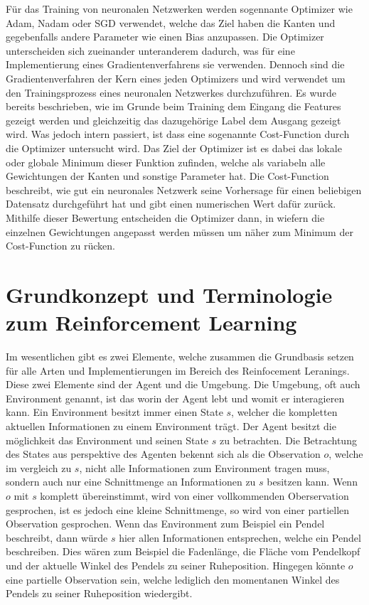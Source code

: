 \documentclass[]{iat}
\begin{document}
Für das Training von neuronalen Netzwerken werden sogennante Optimizer wie Adam, Nadam oder SGD verwendet, welche das Ziel haben die Kanten und gegebenfalls andere Parameter wie einen Bias anzupassen. Die Optimizer unterscheiden sich zueinander unteranderem dadurch, was für eine Implementierung eines Gradientenverfahrens sie verwenden. Dennoch sind die Gradientenverfahren der Kern eines jeden Optimizers und wird verwendet um den Trainingsprozess eines neuronalen Netzwerkes durchzuführen. Es wurde bereits beschrieben, wie im Grunde beim Training dem Eingang die Features gezeigt werden und gleichzeitig das dazugehörige Label dem Ausgang gezeigt wird. Was jedoch intern passiert, ist dass eine sogenannte Cost-Function durch die Optimizer untersucht wird. Das Ziel der Optimizer ist es dabei das lokale oder globale Minimum dieser Funktion zufinden, welche als variabeln alle Gewichtungen der Kanten und sonstige Parameter hat. Die Cost-Function beschreibt, wie gut ein neuronales Netzwerk seine Vorhersage für einen beliebigen Datensatz durchgeführt hat und gibt einen numerischen Wert dafür zurück. Mithilfe dieser Bewertung entscheiden die Optimizer dann, in wiefern die einzelnen Gewichtungen angepasst werden müssen um näher zum Minimum der Cost-Function zu rücken.

\section{Grundkonzept und Terminologie zum Reinforcement Learning} \label{sec:grundkonzept_rf}
Im wesentlichen gibt es zwei Elemente, welche zusammen die Grundbasis setzen für alle Arten und Implementierungen im Bereich des Reinfocement Leranings. Diese zwei Elemente sind der Agent und die Umgebung. Die Umgebung, oft auch Environment genannt, ist das worin der Agent lebt und womit er interagieren kann. Ein Environment besitzt immer einen State $s$, welcher die kompletten aktuellen Informationen zu einem Environment trägt. Der Agent besitzt die möglichkeit das Environment und seinen State $s$ zu betrachten. Die Betrachtung des States aus perspektive des Agenten bekennt sich als die Observation $o$, welche im vergleich zu $s$, nicht alle Informationen zum Environment tragen muss, sondern auch nur eine Schnittmenge an Informationen zu $s$ besitzen kann. Wenn $o$ mit $s$ komplett übereinstimmt, wird von einer vollkommenden Oberservation gesprochen, ist es jedoch eine kleine Schnittmenge, so wird von einer partiellen Observation gesprochen. Wenn das Environment zum Beispiel ein Pendel beschreibt, dann würde $s$ hier allen Informationen entsprechen, welche ein Pendel beschreiben. Dies wären zum Beispiel die Fadenlänge, die Fläche vom Pendelkopf und der aktuelle Winkel des Pendels zu seiner Ruheposition. Hingegen könnte $o$ eine partielle Observation sein, welche lediglich den momentanen Winkel des Pendels zu seiner Ruheposition wiedergibt.
\end{document}
